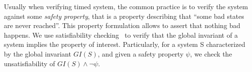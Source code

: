 Usually when verifying timed system, the common practice is to verify the system 
against some \emph{safety property}, that is a property 
describing that \enquote{some bad states are never reached}. This property 
formulation allows to assert that nothing bad happens.
We use satisfiability checking~\cite{} to verify that the global 
invariant of a system 
implies the property of interest. Particularly, for a system S characterized 
by the global invariant $GI(S)$, and 
given a safety property $\psi$, we check the unsatisfiability of 
$GI(S)\wedge\neg\psi$. 



